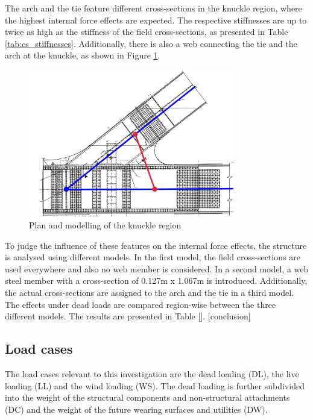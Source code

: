 The arch and the tie feature different cross-sections in the knuckle region, where the highest internal force effects are expected. The respective stiffnesses are up to twice as high as the stiffness of the field cross-sections, as presented in Table \ref{tab:cs_stiffnesses}. Additionally, there is also a web connecting the tie and the arch at the knuckle, as shown in Figure \ref{fig:knuckle_region}.



\begin{figure}[H]
    \centering
    \includegraphics[width=0.8\textwidth]{overleaf/Pictures/Knuckle region.png}
    \caption{Plan and modelling of the knuckle region}
    \label{fig:knuckle_region}
\end{figure}

To judge the influence of these features on the internal force effects, the structure is analysed using different models. In the first model, the field cross-sections are used everywhere and also no web member is considered. In a second model, a web steel member with a cross-section of 0.127m x 1.067m is introduced. Additionally, the actual cross-sections are assigned to the arch and the tie in a third model. The effects under dead loads are compared region-wise between the three different models. The results are presented in Table []. [conclusion]

\newpage
\subsection{Load cases} \label{sec:met_loads}
The load cases relevant to this investigation are the dead loading (DL), the live loading (LL) and the wind loading (WS). The dead loading is further subdivided into the weight of the structural components and non-structural attachments (DC) and the weight of the future wearing surfaces and utilities (DW).

